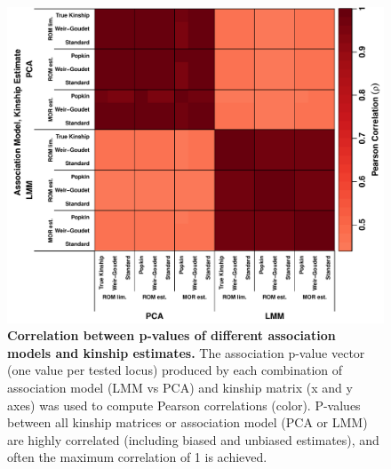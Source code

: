 \documentclass[11pt]{article}
\begin{document}
\begin{figure}[bp!]
  \centering
  \includegraphics[width=\textwidth]{pvals_cor.pdf}
  \caption{
    {\bf Correlation between p-values of different association models and kinship estimates.}
    The association p-value vector (one value per tested locus) produced by each combination of association model (LMM vs PCA) and kinship matrix (x and y axes) was used to compute Pearson correlations (color).
    P-values between all kinship matrices or association model (PCA or LMM) are highly correlated (including biased and unbiased estimates), and often the maximum correlation of 1 is achieved.
  }
  \label{fig:pvals_cor_real}
\end{figure}
\end{document}
